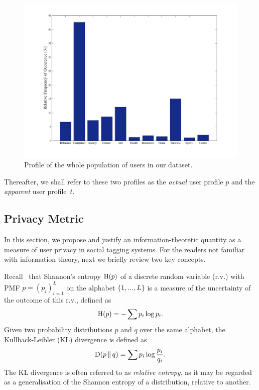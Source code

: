 \begin{figure}[htb]  
\includegraphics[width=\textwidth]{figures/PPRel.pdf}
\caption[Population PMF.]{Profile of the whole population of users in our dataset.
\label{fig:PopProfile}}
\end{figure}

Thereafter, we shall refer to these two profiles as the \emph{actual} user profile $p$ and the \emph{apparent} user profile~$t$.

\subsection{Privacy Metric}
\label{sec:priv-metric}
In this section, we propose and justify an information-theoretic quantity as a measure of user privacy in social tagging systems.
For the readers not familiar with information theory, next we briefly review two key concepts.

Recall~\cite{Cover06B} that Shannon's entropy $\operatorname{H}(p)$ of a discrete random variable (r.v.) with PMF $p=(p_i)_{i=1}^L$ on the alphabet $\{1,\ldots,L\}$ is a measure of the uncertainty of the outcome of this r.v., defined as
\begin{equation*}
\operatorname{H}(p)=-\sum p_i   \log p_i.
\end{equation*}
Given two probability distributions $p$ and $q$ over the same alphabet, the Kullback-Leibler (KL) divergence is defined as
\begin{equation*}
\operatorname{D}(p\,\|\,q)=\sum p_i   \log \frac{p_i}{q_i}.
\end{equation*}
The KL divergence is often referred to as \emph{relative entropy}, as it may be regarded as a generalisation of the Shannon entropy of a distribution, relative to another.

